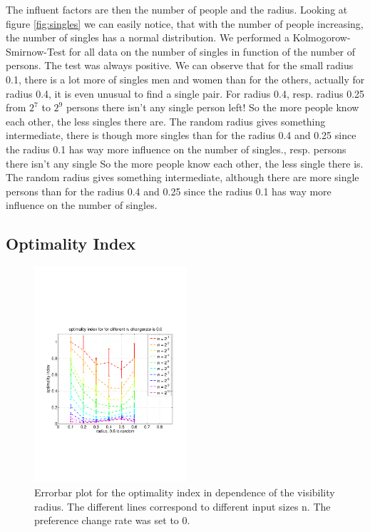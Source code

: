 \documentclass[11pt]{article}
\begin{document}
 The influent factors are then the number of people and the radius. Looking at figure \ref{fig:singles} we can 
easily notice, that with the number of people increasing, the number of singles has a normal
distribution. We performed a Kolmogorow-Smirnow-Test for all data on the number of singles in function of 
the number of persons. The test was always positive. We can observe that for the small radius 0.1, there is 
a lot more of singles men and women than for the others, actually for radius 0.4, it is even unusual to 
find a single pair. For radius 0.4, resp. radius 0.25 from $2^{7}$ to $2^{9}$ persons there isn't any single
person left! So the more people know each other, the less singles there are. The random radius gives 
something intermediate, there is though more singles than for the radius 0.4 and 0.25 since the 
radius 0.1 has way more influence on the number of singles., resp.  persons there isn’t any single
So the more people know each other, the less single there is. The random
radius gives something intermediate, although there are more single persons than for the radius 0.4 and
0.25 since the radius 0.1 has way more influence on the number of singles.

\subsection{Optimality Index}

\begin{figure}[t]
	\includegraphics[trim=0 180 0 180, clip, height=8cm]{../../code/data/2014_12_12_00_55_41/figure_4}
	\caption{Errorbar plot for the optimality index in dependence of the visibility radius. The different lines correspond to different input
	sizes n. The preference change rate was set to 0.}
	\label{fig:optimality2}
\end{figure}
\end{document}
